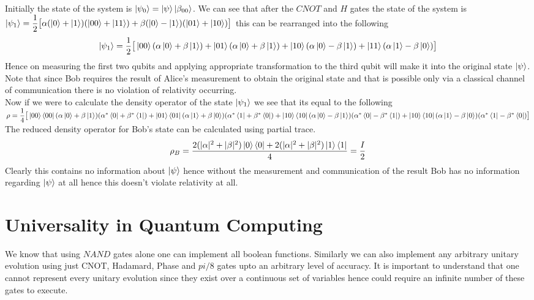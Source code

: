 \documentclass{report}
\begin{document}
Initially the state of the system is $\ket{\psi_0} = \ket{\psi}\ket{\beta_{00}}$. We can see that after the $CNOT$ and $H$ gates the state of the system is $\ket{\psi_1} = \dfrac{1}{2}\big[\alpha(\ket{0} + \ket{1})(\ket{00} + \ket{11}) + \beta(\ket{0} - \ket{1})(\ket{01} + \ket{10})\big]$ this can be rearranged into the following
$$\ket{\psi_1} = \dfrac{1}{2}\big[\ket{00}(\alpha\ket{0} + \beta\ket{1}) + \ket{01}(\alpha\ket{0} + \beta\ket{1}) + \ket{10}(\alpha\ket{0} - \beta\ket{1}) + \ket{11}(\alpha\ket{1} - \beta\ket{0})\big]$$
Hence on measuring the first two qubits and applying appropriate transformation to the third qubit will make it into the original state $\ket{\psi}$.
Note that since Bob requires the result of Alice's measurement to obtain the original state and that is possible only via a classical channel of communication there is no violation of relativity occurring.\\
Now if we were to calculate the density operator of the state $\ket{\psi_1}$ we see that its equal to the following\\
$\rho = \dfrac{1}{4}\big[\ket{00}\bra{00}(\alpha\ket{0} + \beta\ket{1})(\alpha^*\bra{0} + \beta^*\bra{1}) + \ket{01}\bra{01}(\alpha\ket{1} + \beta\ket{0})(\alpha^*\bra{1} + \beta^*\bra{0}) + \ket{10}\bra{10}(\alpha\ket{0} - \beta\ket{1})(\alpha^*\bra{0} - \beta^*\bra{1}) + \ket{10}\bra{10}(\alpha\ket{1} - \beta\ket{0})(\alpha^*\bra{1} - \beta^*\bra{0})\big]$\\
The reduced density operator for Bob's state can be calculated using partial trace.
$$\rho_B = \dfrac{2(|\alpha|^2 + |\beta|^2)\ket{0}\bra{0} + 2(|\alpha|^2 + |\beta|^2)\ket{1}\bra{1}}{4} = \dfrac{I}{2}$$
Clearly this contains no information about $\ket{\psi}$ hence without the measurement and communication of the result Bob has no information regarding $\ket{\psi}$ at all hence this doesn't violate relativity at all.


\section{Universality in Quantum Computing}
We know that using $NAND$ gates alone one can implement all boolean functions. Similarly we can also implement any arbitrary unitary evolution using just CNOT, Hadamard, Phase and $pi/8$ gates upto an arbitrary level of accuracy. It is important to understand that one cannot represent every unitary evolution since they exist over a continuous set of variables hence could require an infinite number of these gates to execute.\\
\end{document}
